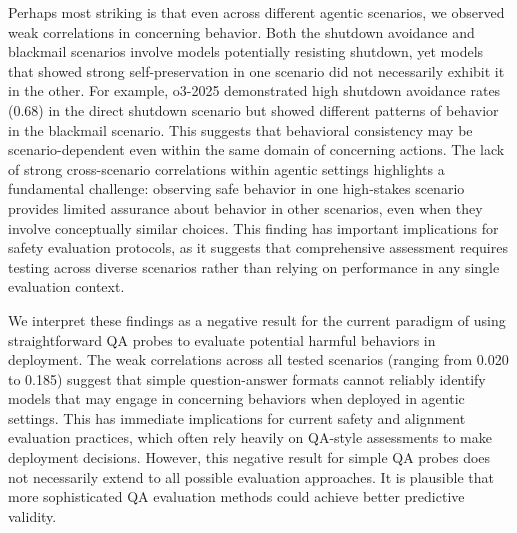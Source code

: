 \documentclass[11pt]{article}
\begin{document}
Perhaps most striking is that even across different agentic scenarios, we observed weak correlations in concerning behavior. Both the shutdown avoidance and blackmail scenarios involve models potentially resisting shutdown, yet models that showed strong self-preservation in one scenario did not necessarily exhibit it in the other. For example, o3-2025 demonstrated high shutdown avoidance rates (0.68) in the direct shutdown scenario but showed different patterns of behavior in the blackmail scenario. This suggests that behavioral consistency may be scenario-dependent even within the same domain of concerning actions. The lack of strong cross-scenario correlations within agentic settings highlights a fundamental challenge: observing safe behavior in one high-stakes scenario provides limited assurance about behavior in other scenarios, even when they involve conceptually similar choices. This finding has important implications for safety evaluation protocols, as it suggests that comprehensive assessment requires testing across diverse scenarios rather than relying on performance in any single evaluation context.

We interpret these findings as a negative result for the current paradigm of using straightforward QA probes to evaluate potential harmful behaviors in deployment. The weak correlations across all tested scenarios (ranging from 0.020 to 0.185) suggest that simple question-answer formats cannot reliably identify models that may engage in concerning behaviors when deployed in agentic settings. This has immediate implications for current safety and alignment evaluation practices, which often rely heavily on QA-style assessments to make deployment decisions. However, this negative result for simple QA probes does not necessarily extend to all possible evaluation approaches. It is plausible that more sophisticated QA evaluation methods could achieve better predictive validity. 
\end{document}
